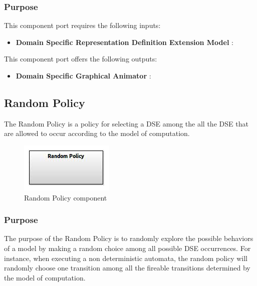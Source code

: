 \documentclass{gemoc} %
\begin{document}
\subsubsection{Purpose}

This component port requires the following inputs:
\begin{itemize}
  \item \textbf{Domain Specific Representation Definition Extension Model} :
\end{itemize}

This component port offers the following outputs:
\begin{itemize}
  \item \textbf{Domain Specific Graphical Animator} :
\end{itemize}

\subsection{Random Policy}
The Random Policy is a policy for selecting a DSE among the all the DSE that are allowed to occur according to the model of computation.
\begin{figure}[htp]
	\begin{center}
	\includegraphics*[trim=0.0cm 0.0cm 0cm 0.0cm, clip=true, scale=1.0]{../images/generated/Generated_Random Policy.jpg}
	\caption{Random Policy component}
	\end{center}
\end{figure}

\subsubsection{Purpose}
The purpose of the Random Policy is to randomly explore the possible behaviors of a model by making a random choice among all possible DSE occurrences. For instance, when executing a non deterministic automata, the random policy will randomly choose one transition among all the fireable transitions determined by the model of computation.
\end{document}
